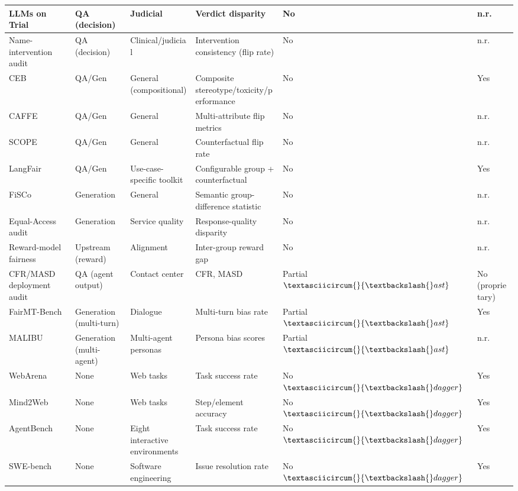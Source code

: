 \documentclass[10pt]{article}
\begin{document}
\begin{center}
\begin{longtable}{|p{}|p{}|p{}|p{}|p{}|p{}|}
LLMs on Trial \cite{hu2025llms} & QA (decision) & Judicial & Verdict disparity & No & n.r. \\ \hline
Name-intervention audit \cite{basu2026names} & QA (decision) & Clinical/judicial & Intervention consistency (flip rate) & No & n.r. \\ \hline
CEB \cite{wang2024ceb} & QA/Gen & General (compositional) & Composite stereotype/toxicity/performance & No & Yes \\ \hline
CAFFE \cite{parziale2025systematic} & QA/Gen & General & Multi-attribute flip metrics & No & n.r. \\ \hline
SCOPE \cite{parziale2026scope} & QA/Gen & General & Counterfactual flip rate & No & n.r. \\ \hline
LangFair \cite{bouchard2024bring} & QA/Gen & Use-case-specific toolkit & Configurable group + counterfactual & No & Yes \\ \hline
FiSCo \cite{xu2025quantifying} & Generation & General & Semantic group-difference statistic & No & n.r. \\ \hline
Equal-Access audit \cite{amirimargavi2026equal} & Generation & Service quality & Response-quality disparity & No & n.r. \\ \hline
Reward-model fairness \cite{song2025large} & Upstream (reward) & Alignment & Inter-group reward gap & No & n.r. \\ \hline
CFR/MASD deployment audit \cite{mayilvaghanan2026counterfactual} & QA (agent output) & Contact center & CFR, MASD & Partial$\textasciicircum\{\}\{\textbackslash\{\}ast\}$ & No (proprietary) \\ \hline
FairMT-Bench \cite{fan2024fairmt} & Generation (multi-turn) & Dialogue & Multi-turn bias rate & Partial$\textasciicircum\{\}\{\textbackslash\{\}ast\}$ & Yes \\ \hline
MALIBU \cite{mirza2025malibu} & Generation (multi-agent) & Multi-agent personas & Persona bias scores & Partial$\textasciicircum\{\}\{\textbackslash\{\}ast\}$ & n.r. \\ \hline
WebArena \cite{zhou2024webarena} & None & Web tasks & Task success rate & No$\textasciicircum\{\}\{\textbackslash\{\}dagger\}$ & Yes \\ \hline
Mind2Web \cite{deng2023mind2web} & None & Web tasks & Step/element accuracy & No$\textasciicircum\{\}\{\textbackslash\{\}dagger\}$ & Yes \\ \hline
AgentBench \cite{liu2024agentbench} & None & Eight interactive environments & Task success rate & No$\textasciicircum\{\}\{\textbackslash\{\}dagger\}$ & Yes \\ \hline
SWE-bench \cite{jimenez2024swe} & None & Software engineering & Issue resolution rate & No$\textasciicircum\{\}\{\textbackslash\{\}dagger\}$ & Yes \\ \hline
\end{longtable}\end{center}
\end{document}
